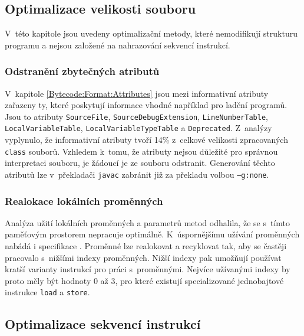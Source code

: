 
\subsection{Optimalizace velikosti souboru}

V~této kapitole jsou uvedeny optimalizační metody, které nemodifikují strukturu programu a nejsou založené na nahrazování sekvencí instrukcí.


\subsubsection{Odstranění zbytečných atributů}
V~kapitole \ref{Bytecode:Format:Attributes} jsou mezi informativní atributy zařazeny ty, které poskytují informace vhodné například pro ladění programů. Jsou to atributy \texttt{SourceFile}, \texttt{SourceDebugExtension}, \texttt{LineNumberTable}, \texttt{LocalVariableTable}, \texttt{LocalVariableTypeTable} a \texttt{Deprecated}.  Z~analýzy vyplynulo, že informativní atributy tvoří 14\% z~celkové velikosti zpracovaných \texttt{class} souborů. Vzhledem k~tomu, že atributy nejsou důležité pro správnou interpretaci souboru, je žádoucí je ze souboru odstranit. Generování těchto atributů lze v~překladači \texttt{javac} zabránit již za překladu volbou \texttt{--g:none}.

\subsubsection{Realokace lokálních proměnných}
Analýza užití lokálních proměnných a parametrů metod odhalila, že se s~tímto paměťovým prostorem nepracuje optimálně. K~úspornějšímu užívání proměnných nabádá i specifikace \cite{Lindholm:JVM}. Proměnné lze realokovat a recyklovat tak, aby se častěji pracovalo s~nižšími indexy proměnných. Nižší indexy pak umožňují používat kratší varianty instrukcí pro práci s~proměnnými. Nejvíce užívanými indexy by proto měly být hodnoty 0 až 3, pro které existují specializované jednobajtové instrukce \texttt{load} a \texttt{store}. 


\subsection{Optimalizace sekvencí instrukcí}

